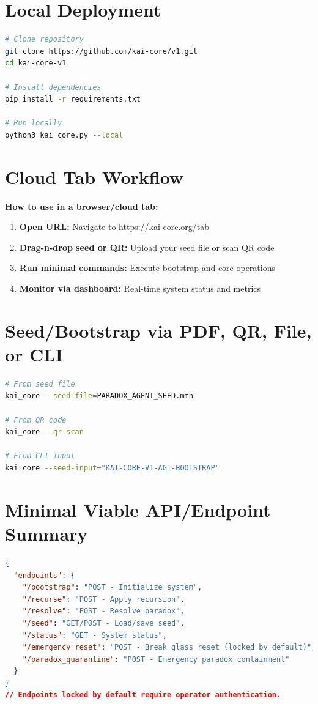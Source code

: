 \documentclass[11pt]{report}
\begin{document}
\section{Local Deployment}
\begin{lstlisting}[language=bash,caption={Local Setup}]
# Clone repository
git clone https://github.com/kai-core/v1.git
cd kai-core-v1

# Install dependencies
pip install -r requirements.txt

# Run locally
python3 kai_core.py --local
\end{lstlisting}

\section{Cloud Tab Workflow}
\textbf{How to use in a browser/cloud tab:}

\begin{enumerate}
\item \textbf{Open URL:} Navigate to \url{https://kai-core.org/tab}
\item \textbf{Drag-n-drop seed or QR:} Upload your seed file or scan QR code
\item \textbf{Run minimal commands:} Execute bootstrap and core operations
\item \textbf{Monitor via dashboard:} Real-time system status and metrics
\end{enumerate}

\section{Seed/Bootstrap via PDF, QR, File, or CLI}
\begin{lstlisting}[language=bash,caption={Bootstrap Methods}]
# From seed file
kai_core --seed-file=PARADOX_AGENT_SEED.mmh

# From QR code
kai_core --qr-scan

# From CLI input
kai_core --seed-input="KAI-CORE-V1-AGI-BOOTSTRAP"
\end{lstlisting}

\section{Minimal Viable API/Endpoint Summary}
\begin{lstlisting}[language=json,caption={API Endpoints}]
{
  "endpoints": {
    "/bootstrap": "POST - Initialize system",
    "/recurse": "POST - Apply recursion",
    "/resolve": "POST - Resolve paradox",
    "/seed": "GET/POST - Load/save seed",
    "/status": "GET - System status",
    "/emergency_reset": "POST - Break glass reset (locked by default)",
    "/paradox_quarantine": "POST - Emergency paradox containment"
  }
}
// Endpoints locked by default require operator authentication.
\end{lstlisting}
\end{document}
